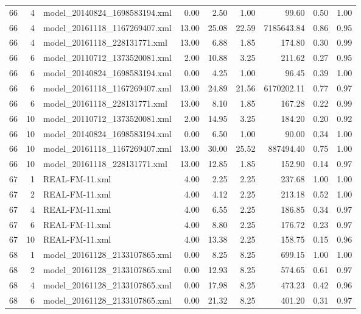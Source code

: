 \begin{table}[ht]
\begin{tabular}{rrlrrrrrr}
   66 &   4 & model\_20140824\_1698583194.xml & 0.00 & 2.50 & 1.00 & 99.60 & 0.50 & 1.00 \\ 
   66 &   4 & model\_20161118\_1167269407.xml & 13.00 & 25.08 & 22.59 & 7185643.84 & 0.86 & 0.95 \\ 
   66 &   4 & model\_20161118\_228131771.xml & 13.00 & 6.88 & 1.85 & 174.80 & 0.30 & 0.99 \\ 
   66 &   6 & model\_20110712\_1373520081.xml & 2.00 & 10.88 & 3.25 & 211.62 & 0.27 & 0.95 \\ 
   66 &   6 & model\_20140824\_1698583194.xml & 0.00 & 4.25 & 1.00 & 96.45 & 0.39 & 1.00 \\ 
   66 &   6 & model\_20161118\_1167269407.xml & 13.00 & 24.89 & 21.56 & 6170202.11 & 0.77 & 0.97 \\ 
   66 &   6 & model\_20161118\_228131771.xml & 13.00 & 8.10 & 1.85 & 167.28 & 0.22 & 0.99 \\ 
   66 &  10 & model\_20110712\_1373520081.xml & 2.00 & 14.95 & 3.25 & 184.20 & 0.20 & 0.92 \\ 
   66 &  10 & model\_20140824\_1698583194.xml & 0.00 & 6.50 & 1.00 & 90.00 & 0.34 & 1.00 \\ 
   66 &  10 & model\_20161118\_1167269407.xml & 13.00 & 30.00 & 25.52 & 887494.40 & 0.75 & 1.00 \\ 
   66 &  10 & model\_20161118\_228131771.xml & 13.00 & 12.85 & 1.85 & 152.90 & 0.14 & 0.97 \\ 
   67 &   1 & REAL-FM-11.xml & 4.00 & 2.25 & 2.25 & 237.68 & 1.00 & 1.00 \\ 
   67 &   2 & REAL-FM-11.xml & 4.00 & 4.12 & 2.25 & 213.18 & 0.52 & 1.00 \\ 
   67 &   4 & REAL-FM-11.xml & 4.00 & 6.55 & 2.25 & 186.85 & 0.34 & 0.97 \\ 
   67 &   6 & REAL-FM-11.xml & 4.00 & 8.80 & 2.25 & 176.72 & 0.23 & 0.97 \\ 
   67 &  10 & REAL-FM-11.xml & 4.00 & 13.38 & 2.25 & 158.75 & 0.15 & 0.96 \\ 
   68 &   1 & model\_20161128\_2133107865.xml & 0.00 & 8.25 & 8.25 & 699.15 & 1.00 & 1.00 \\ 
   68 &   2 & model\_20161128\_2133107865.xml & 0.00 & 12.93 & 8.25 & 574.65 & 0.61 & 0.97 \\ 
   68 &   4 & model\_20161128\_2133107865.xml & 0.00 & 17.98 & 8.25 & 473.23 & 0.42 & 0.96 \\ 
   68 &   6 & model\_20161128\_2133107865.xml & 0.00 & 21.32 & 8.25 & 401.20 & 0.31 & 0.97 \\ 

\end{tabular}
\end{table}
